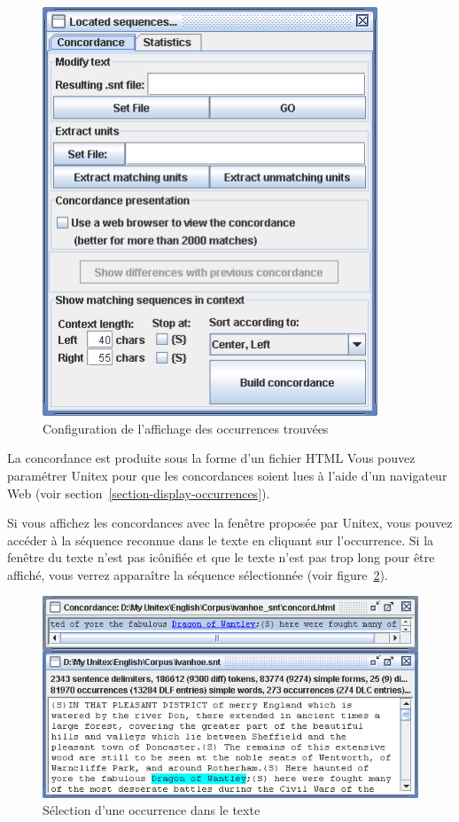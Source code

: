 \bigskip
\begin{figure}[h]
\begin{center}
\includegraphics[width=10cm]{resources/img/fig6-31.png}
\caption{Configuration de l’affichage des occurrences trouvées
\label{fig-configuration-display-occurrences}}
\end{center}
\end{figure}

\noindent La concordance est produite sous la forme d’un fichier HTML
 Vous pouvez paramétrer Unitex pour que les concordances soient lues
à l’aide d’un navigateur Web (voir section~\ref{section-display-occurrences}).

\bigskip
\noindent Si vous affichez les concordances avec la fenêtre proposée par Unitex, vous pouvez accéder
à la séquence reconnue dans le texte en cliquant sur l’occurrence. Si la fenêtre du texte n’est pas
icônifiée et que le texte n’est pas trop long pour être affiché, vous verrez apparaître
la séquence sélectionnée (voir figure~\ref{fig-back-to-text}).

\bigskip
\begin{figure}[h]
\begin{center}
\includegraphics[width=13.5cm]{resources/img/fig6-32.png}
\caption{Sélection d’une occurrence dans le texte\label{fig-back-to-text}}
\end{center}
\end{figure}

